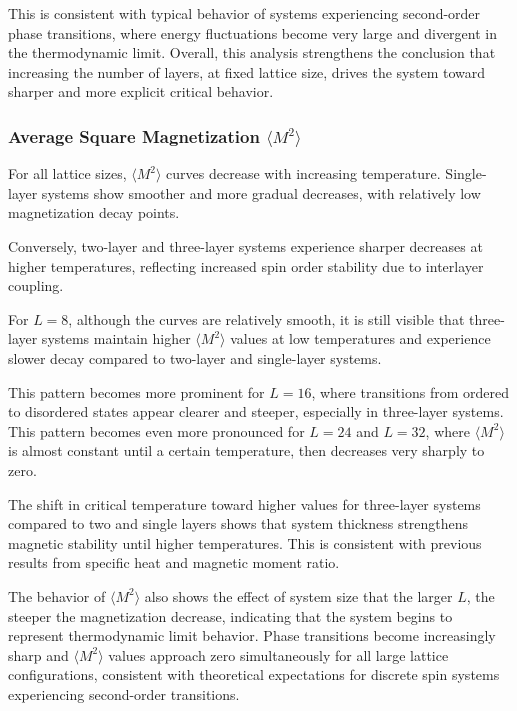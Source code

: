 This is consistent with typical behavior of systems experiencing second-order phase transitions, where energy fluctuations become very large and divergent in the thermodynamic limit. Overall, this analysis strengthens the conclusion that increasing the number of layers, at fixed lattice size, drives the system toward sharper and more explicit critical behavior.

\subsubsection{Average Square Magnetization $\langle M^2 \rangle$}

For all lattice sizes, $\langle M^2 \rangle$ curves decrease with increasing temperature. Single-layer systems show smoother and more gradual decreases, with relatively low magnetization decay points.

Conversely, two-layer and three-layer systems experience sharper decreases at higher temperatures, reflecting increased spin order stability due to interlayer coupling.

For $L = 8$, although the curves are relatively smooth, it is still visible that three-layer systems maintain higher $\langle M^2 \rangle$ values at low temperatures and experience slower decay compared to two-layer and single-layer systems.

This pattern becomes more prominent for $L = 16$, where transitions from ordered to disordered states appear clearer and steeper, especially in three-layer systems. This pattern becomes even more pronounced for $L = 24$ and $L = 32$, where $\langle M^2 \rangle$ is almost constant until a certain temperature, then decreases very sharply to zero.

The shift in critical temperature toward higher values for three-layer systems compared to two and single layers shows that system thickness strengthens magnetic stability until higher temperatures. This is consistent with previous results from specific heat and magnetic moment ratio.

The behavior of $\langle M^2 \rangle$ also shows the effect of system size that the larger $L$, the steeper the magnetization decrease, indicating that the system begins to represent thermodynamic limit behavior. Phase transitions become increasingly sharp and $\langle M^2 \rangle$ values approach zero simultaneously for all large lattice configurations, consistent with theoretical expectations for discrete spin systems experiencing second-order transitions.

